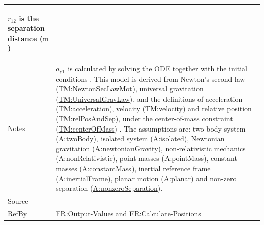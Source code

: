\documentclass[12pt]{article}
\begin{document}
\begin{minipage}{\textwidth}
\begin{tabular}{>{\raggedright}p{}>{\raggedright\arraybackslash}p{}}
\begin{symbDescription}
              \item{${r_{12}}$ is the separation distance (${\text{m}}$)}
              \end{symbDescription}
\\ \midrule
Notes & ${a_{\text{y}1}}$ is calculated by solving the ODE together with the initial conditions . This model is derived from Newton's second law (\hyperref[TM:NewtonSecLawMot]{TM:NewtonSecLawMot}), universal gravitation (\hyperref[TM:UniversalGravLaw]{TM:UniversalGravLaw}), and the definitions of acceleration (\hyperref[TM:acceleration]{TM:acceleration}), velocity (\hyperref[TM:velocity]{TM:velocity}) and relative position (\hyperref[TM:relPosAndSep]{TM:relPosAndSep}), under the center-of-mass constraint (\hyperref[TM:centerOfMass]{TM:centerOfMass}) . The assumptions are: two-body system (\hyperref[twoBody]{A:twoBody}), isolated system (\hyperref[isolated]{A:isolated}), Newtonian gravitation (\hyperref[newtonianGravity]{A:newtonianGravity}), non-relativistic mechanics (\hyperref[nonRelativistic]{A:nonRelativistic}), point masses (\hyperref[pointMass]{A:pointMass}), constant masses (\hyperref[constantMass]{A:constantMass}), inertial reference frame (\hyperref[inertialFrame]{A:inertialFrame}), planar motion (\hyperref[planar]{A:planar}) and non-zero separation (\hyperref[nonzeroSeparation]{A:nonzeroSeparation}).
        
\\ \midrule
Source & --
         
\\ \midrule
RefBy & \hyperref[outputValues]{FR:Output-Values} and \hyperref[calcPositions]{FR:Calculate-Positions}
        
\\ \bottomrule
\end{tabular}
\end{minipage}
\end{document}
